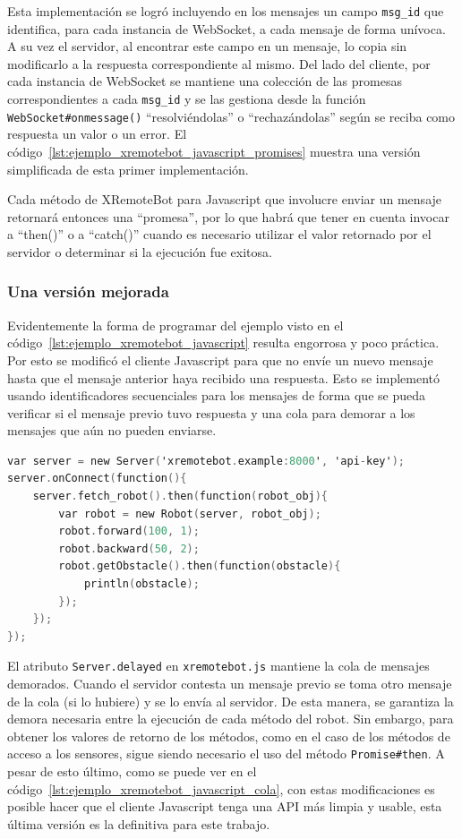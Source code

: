 Esta implementación se logró incluyendo en los mensajes un campo
\texttt{msg\_id} que identifica, para cada instancia de WebSocket, a
cada mensaje de forma unívoca. A su vez el servidor, al encontrar este
campo en un mensaje, lo copia sin modificarlo a la respuesta correspondiente
al mismo. Del lado del cliente, por cada instancia de WebSocket se mantiene
una colección de las promesas correspondientes
a cada \texttt{msg\_id} y se las gestiona desde la función
\texttt{WebSocket\#onmessage()} ``resolviéndolas'' o ``rechazándolas'' según
se reciba como respuesta un valor o un error. El
código~\ref{lst:ejemplo_xremotebot_javascript_promises} muestra una versión
simplificada de esta primer implementación.

Cada método de XRemoteBot para Javascript que involucre enviar un mensaje
retornará entonces una ``promesa'', por lo que habrá que tener en cuenta
invocar a ``then()'' o a ``catch()'' cuando es necesario
utilizar el valor retornado por el servidor o determinar si la ejecución fue exitosa.

\subsubsection{Una versión mejorada}

Evidentemente la forma de programar del ejemplo visto en el
código~\ref{lst:ejemplo_xremotebot_javascript}
resulta engorrosa y poco práctica.
Por esto se modificó el cliente Javascript para que no envíe un nuevo mensaje hasta
que el mensaje anterior haya recibido una respuesta. Esto se implementó usando
identificadores secuenciales para los mensajes de forma que se pueda verificar si
el mensaje previo tuvo respuesta y una cola para demorar a los mensajes que aún no
pueden enviarse.

\begin{lstlisting}[language=C,
caption={Ejemplo de XRemoteBot en Javascript con empleo de una cola para
serializar mensajes},
label=lst:ejemplo_xremotebot_javascript_cola]
var server = new Server('xremotebot.example:8000', 'api-key');
server.onConnect(function(){
    server.fetch_robot().then(function(robot_obj){
        var robot = new Robot(server, robot_obj);
        robot.forward(100, 1);
        robot.backward(50, 2);
        robot.getObstacle().then(function(obstacle){
            println(obstacle);
        });
    });
});
\end{lstlisting}

El atributo \texttt{Server.delayed} en \texttt{xremotebot.js} mantiene la cola
de mensajes demorados.
Cuando el servidor contesta un mensaje previo se toma otro mensaje
de la cola (si lo hubiere) y se lo envía al servidor. De esta manera,
se garantiza la demora necesaria entre la ejecución de cada método
del robot. Sin embargo, para obtener los valores de retorno de los métodos,
como en el caso de los métodos de acceso a los sensores, sigue siendo
necesario el uso del método \texttt{Promise\#then}. A pesar de esto último,
como se puede ver en el código~\ref{lst:ejemplo_xremotebot_javascript_cola},
con estas modificaciones es posible hacer que el cliente Javascript
tenga una API más limpia y usable, esta última versión es la definitiva
para este trabajo.

